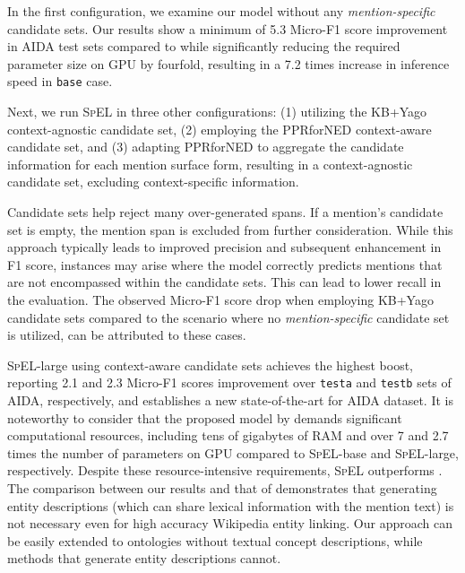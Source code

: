 \documentclass[11pt]{article}
\begin{document}
In the first configuration, we examine our model without any \textit{mention-specific} candidate sets. Our results show a minimum of 5.3 Micro-F1 score improvement in AIDA test sets compared to \cite{K19-1063} while significantly reducing the required parameter size on GPU by fourfold, resulting in a 7.2 times increase in inference speed in \texttt{base} case.

Next, we run \textsc{SpEL} in three other configurations: (1) utilizing the KB+Yago \cite{D17-1277} context-agnostic candidate set, (2) employing the PPRforNED \cite{N15-1026} context-aware candidate set, and (3) adapting PPRforNED to aggregate the candidate information for each mention surface form, resulting in a context-agnostic candidate set, excluding context-specific information.

Candidate sets help reject many over-generated spans. If a mention's candidate set is empty, the mention span is excluded from further consideration. While this approach typically leads to improved precision and subsequent enhancement in F1 score, instances may arise where the model correctly predicts mentions that are not encompassed within the candidate sets. This can lead to lower recall in the evaluation. The observed Micro-F1 score drop when employing KB+Yago candidate sets compared to the scenario where no \textit{mention-specific} candidate set is utilized, can be attributed to these cases.

\textsc{SpEL}-large using context-aware candidate sets achieves the highest boost, reporting 2.1 and 2.3 Micro-F1 scores improvement over \texttt{testa} and \texttt{testb} sets of AIDA, respectively, and establishes a new state-of-the-art for AIDA dataset. It is noteworthy to consider that the proposed model by \citet{EntQA} demands significant computational resources, including tens of gigabytes of RAM and over 7 and 2.7 times the number of parameters on GPU compared to \textsc{SpEL}-base and \textsc{SpEL}-large, respectively. Despite these resource-intensive requirements, \textsc{SpEL} outperforms \citet{EntQA}. The comparison between our results and that of \citet{2021.emnlp-main.604, GENRE} demonstrates that generating entity descriptions (which can share lexical information with the mention text) is not necessary even for high accuracy Wikipedia entity linking. Our approach can be easily extended to ontologies without textual concept descriptions, while methods that generate entity descriptions cannot.
\end{document}
